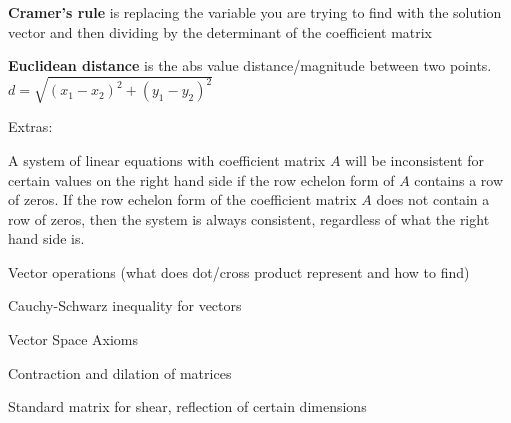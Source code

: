 \documentclass[11pt, letterpaper, twoside]{article}
\begin{document}
\vspace{2mm}
\textbf{Cramer's rule} is replacing the variable you are trying to find with the solution vector and then dividing by the determinant of the coefficient matrix

\vspace{2mm}
\textbf{Euclidean distance} is the abs value distance/magnitude between two points. \(d=\sqrt{(x_1-x_2)^2+(y_1-y_2)^2}\)

\vspace{2mm}
Extras:

\vspace{2mm}
A system of linear equations with coefficient matrix \(A\) will be inconsistent for certain values on the right hand side if the row echelon form of \(A\) contains a row of zeros. If the row echelon form of the coefficient matrix \(A\) does not contain a row of zeros, then the system is always consistent, regardless of what the right hand side is.

Vector operations (what does dot/cross product represent and how to find)

Cauchy-Schwarz inequality for vectors

Vector Space Axioms

Contraction and dilation of matrices

Standard matrix for shear, reflection of certain dimensions
\end{document}
